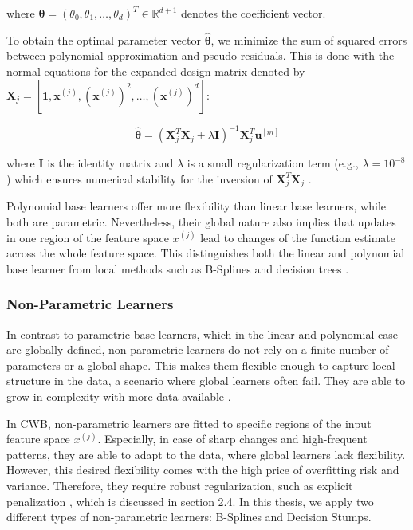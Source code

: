 \documentclass[fontsize=12 pt]{scrartcl}
\begin{document}
where $\boldsymbol{\theta} = (\theta_0, \theta_1, \dots, \theta_d)^T \in \mathbb{R}^{d+1}$ denotes the coefficient vector. 

To obtain the optimal parameter vector $\hat{\boldsymbol{\theta}}$, we minimize the sum of squared errors between polynomial approximation and pseudo-residuals. This is done with the normal equations for the expanded design matrix denoted by $\mathbf{X}_j = [\mathbf{1}, \mathbf{x}^{(j)}, (\mathbf{x}^{(j)})^2, \dots, (\mathbf{x}^{(j)})^d]$:

\begin{equation}
    \hat{\boldsymbol{\theta}} = (\mathbf{X}_j^T \mathbf{X}_j + \lambda \mathbf{I})^{-1} \mathbf{X}_j^T \mathbf{u}^{[m]}
\end{equation}

where $\mathbf{I}$ is the identity matrix and $\lambda$ is a small regularization term (e.g., $\lambda = 10^{-8}$) which ensures numerical stability for the inversion of $\mathbf{X}_j^T \mathbf{X}_j$ \citep{hofner2014model}. 

Polynomial base learners offer more flexibility than linear base learners, while both are parametric. Nevertheless, their global nature also implies that updates in one region of the feature space $x^{(j)}$ lead to changes of the function estimate across the whole feature space. This distinguishes both the linear and polynomial base learner from local methods such as B-Splines and decision trees \citep{buhlmann2003boosting}.

\subsubsection{Non-Parametric Learners}
\label{sec:non_parametric}

In contrast to parametric base learners, which in the linear and polynomial case are globally defined, non-parametric learners do not rely on a finite number of parameters or a global shape. This makes them flexible enough to capture local structure in the data, a scenario where global learners often fail. They are able to grow in complexity with more data available \citep{hastie2009elements}.

In CWB, non-parametric learners are fitted to specific regions of the input feature space $x^{(j)}$. Especially, in case of sharp changes and high-frequent patterns, they are able to adapt to the data, where global learners lack flexibility. However, this desired flexibility comes with the high price of overfitting risk and variance. Therefore, they require robust regularization, such as explicit penalization \citep{hofner2014model}, which is discussed in section 2.4. In this thesis, we apply two different types of non-parametric learners: B-Splines and Decision Stumps.
\end{document}
